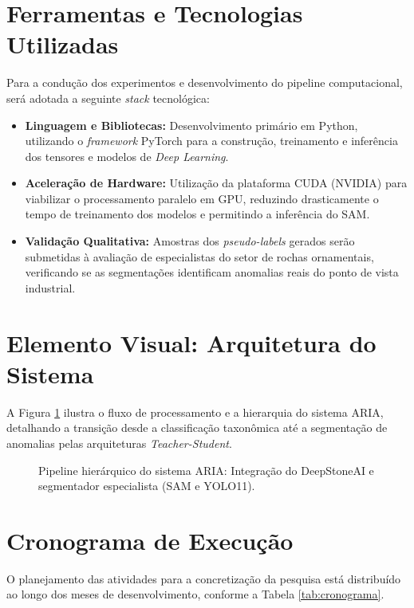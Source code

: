 \section{Ferramentas e Tecnologias Utilizadas}
Para a condução dos experimentos e desenvolvimento do pipeline computacional, será adotada a seguinte \textit{stack} tecnológica:
\begin{itemize}
    \item \textbf{Linguagem e Bibliotecas:} Desenvolvimento primário em Python, utilizando o \textit{framework} PyTorch para a construção, treinamento e inferência dos tensores e modelos de \textit{Deep Learning}.
    \item \textbf{Aceleração de Hardware:} Utilização da plataforma CUDA (NVIDIA) para viabilizar o processamento paralelo em GPU, reduzindo drasticamente o tempo de treinamento dos modelos e permitindo a inferência do SAM.
    \item \textbf{Validação Qualitativa:} Amostras dos \textit{pseudo-labels} gerados serão submetidas à avaliação de especialistas do setor de rochas ornamentais, verificando se as segmentações identificam anomalias reais do ponto de vista industrial.
\end{itemize}

\section{Elemento Visual: Arquitetura do Sistema}
A Figura \ref{fig:arquitetura_hartheus} ilustra o fluxo de processamento e a hierarquia do sistema ARIA, detalhando a transição desde a classificação taxonômica até a segmentação de anomalias pelas arquiteturas \textit{Teacher-Student}.

\begin{figure}[htpb]
    \centering
    \caption{Pipeline hierárquico do sistema ARIA: Integração do DeepStoneAI e segmentador especialista (SAM e YOLO11).}
    \label{fig:arquitetura_hartheus}
\end{figure}

\section{Cronograma de Execução}
O planejamento das atividades para a concretização da pesquisa está distribuído ao longo dos meses de desenvolvimento, conforme a Tabela \ref{tab:cronograma}.

